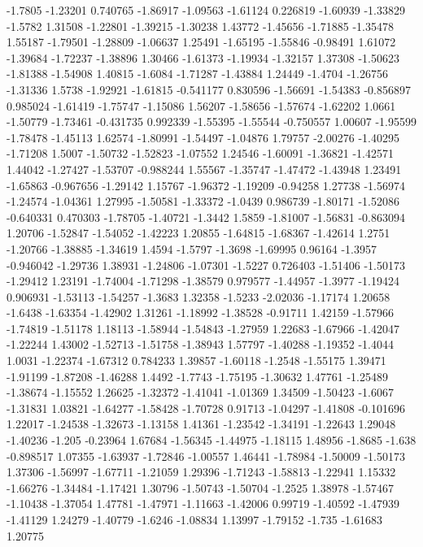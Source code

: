 \documentclass[9pt]{article}
\theoremstyle{plain}
\theoremstyle{definition}
\theoremstyle{remark}
\numberwithin{equation}{section}
\begin{document}
-1.7805
-1.23201
0.740765
-1.86917
-1.09563
-1.61124
0.226819
-1.60939
-1.33829
-1.5782
1.31508
-1.22801
-1.39215
-1.30238
1.43772
-1.45656
-1.71885
-1.35478
1.55187
-1.79501
-1.28809
-1.06637
1.25491
-1.65195
-1.55846
-0.98491
1.61072
-1.39684
-1.72237
-1.38896
1.30466
-1.61373
-1.19934
-1.32157
1.37308
-1.50623
-1.81388
-1.54908
1.40815
-1.6084
-1.71287
-1.43884
1.24449
-1.4704
-1.26756
-1.31336
1.5738
-1.92921
-1.61815
-0.541177
0.830596
-1.56691
-1.54383
-0.856897
0.985024
-1.61419
-1.75747
-1.15086
1.56207
-1.58656
-1.57674
-1.62202
1.0661
-1.50779
-1.73461
-0.431735
0.992339
-1.55395
-1.55544
-0.750557
1.00607
-1.95599
-1.78478
-1.45113
1.62574
-1.80991
-1.54497
-1.04876
1.79757
-2.00276
-1.40295
-1.71208
1.5007
-1.50732
-1.52823
-1.07552
1.24546
-1.60091
-1.36821
-1.42571
1.44042
-1.27427
-1.53707
-0.988244
1.55567
-1.35747
-1.47472
-1.43948
1.23491
-1.65863
-0.967656
-1.29142
1.15767
-1.96372
-1.19209
-0.94258
1.27738
-1.56974
-1.24574
-1.04361
1.27995
-1.50581
-1.33372
-1.0439
0.986739
-1.80171
-1.52086
-0.640331
0.470303
-1.78705
-1.40721
-1.3442
1.5859
-1.81007
-1.56831
-0.863094
1.20706
-1.52847
-1.54052
-1.42223
1.20855
-1.64815
-1.68367
-1.42614
1.2751
-1.20766
-1.38885
-1.34619
1.4594
-1.5797
-1.3698
-1.69995
0.96164
-1.3957
-0.946042
-1.29736
1.38931
-1.24806
-1.07301
-1.5227
0.726403
-1.51406
-1.50173
-1.29412
1.23191
-1.74004
-1.71298
-1.38579
0.979577
-1.44957
-1.3977
-1.19424
0.906931
-1.53113
-1.54257
-1.3683
1.32358
-1.5233
-2.02036
-1.17174
1.20658
-1.6438
-1.63354
-1.42902
1.31261
-1.18992
-1.38528
-0.91711
1.42159
-1.57966
-1.74819
-1.51178
1.18113
-1.58944
-1.54843
-1.27959
1.22683
-1.67966
-1.42047
-1.22244
1.43002
-1.52713
-1.51758
-1.38943
1.57797
-1.40288
-1.19352
-1.4044
1.0031
-1.22374
-1.67312
0.784233
1.39857
-1.60118
-1.2548
-1.55175
1.39471
-1.91199
-1.87208
-1.46288
1.4492
-1.7743
-1.75195
-1.30632
1.47761
-1.25489
-1.38674
-1.15552
1.26625
-1.32372
-1.41041
-1.01369
1.34509
-1.50423
-1.6067
-1.31831
1.03821
-1.64277
-1.58428
-1.70728
0.91713
-1.04297
-1.41808
-0.101696
1.22017
-1.24538
-1.32673
-1.13158
1.41361
-1.23542
-1.34191
-1.22643
1.29048
-1.40236
-1.205
-0.23964
1.67684
-1.56345
-1.44975
-1.18115
1.48956
-1.8685
-1.638
-0.898517
1.07355
-1.63937
-1.72846
-1.00557
1.46441
-1.78984
-1.50009
-1.50173
1.37306
-1.56997
-1.67711
-1.21059
1.29396
-1.71243
-1.58813
-1.22941
1.15332
-1.66276
-1.34484
-1.17421
1.30796
-1.50743
-1.50704
-1.2525
1.38978
-1.57467
-1.10438
-1.37054
1.47781
-1.47971
-1.11663
-1.42006
0.99719
-1.40592
-1.47939
-1.41129
1.24279
-1.40779
-1.6246
-1.08834
1.13997
-1.79152
-1.735
-1.61683
1.20775
\end{document}
